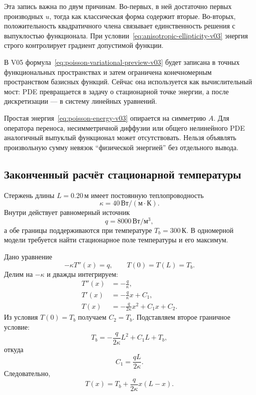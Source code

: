 Эта запись важна по двум причинам. Во-первых, в ней достаточно первых производных $u$, тогда как классическая форма содержит вторые. Во-вторых, положительность квадратичного члена связывает единственность решения с выпуклостью функционала. При условии~\eqref{eq:anisotropic-ellipticity-v03} энергия строго контролирует градиент допустимой функции.

В V05 формула~\eqref{eq:poisson-variational-preview-v03} будет записана в точных функциональных пространствах и затем ограничена конечномерным пространством базисных функций. Сейчас она используется как вычислительный мост: PDE превращается в задачу о стационарной точке энергии, а после дискретизации --- в систему линейных уравнений.

\begin{caution}
Простая энергия~\eqref{eq:poisson-energy-v03} опирается на симметрию $A$. Для оператора переноса, несимметричной диффузии или общего нелинейного PDE аналогичный выпуклый функционал может отсутствовать. Нельзя объявлять произвольную сумму невязок ``физической энергией'' без отдельного вывода.
\end{caution}

\subsection{Законченный расчёт стационарной температуры}

\begin{problem}
Стержень длины $L=0.20\,\text{м}$ имеет постоянную теплопроводность
\[
\kappa=40\,\text{Вт}/(\text{м}\cdot\text{К}).
\]
Внутри действует равномерный источник
\[
q=8000\,\text{Вт}/\text{м}^{3},
\]
а обе границы поддерживаются при температуре $T_b=300\,\text{К}$. В одномерной модели требуется найти стационарное поле температуры и его максимум.
\end{problem}

Дано уравнение
\begin{equation}
\label{eq:rod-poisson-problem-v03}
-\kappa T''(x)=q,
\qquad
T(0)=T(L)=T_b.
\end{equation}
Делим на $-\kappa$ и дважды интегрируем:
\begin{align}
T''(x)&=-\frac{q}{\kappa},\\
T'(x)&=-\frac{q}{\kappa}x+C_1,\\
T(x)&=-\frac{q}{2\kappa}x^2+C_1x+C_2.
\end{align}
Из условия $T(0)=T_b$ получаем $C_2=T_b$. Подставляем второе граничное условие:
\[
T_b
=-\frac{q}{2\kappa}L^2+C_1L+T_b,
\]
откуда
\[
C_1=\frac{qL}{2\kappa}.
\]
Следовательно,
\begin{equation}
\label{eq:rod-temperature-solution-v03}
T(x)
=
T_b
+
\frac{q}{2\kappa}x(L-x).
\end{equation}


